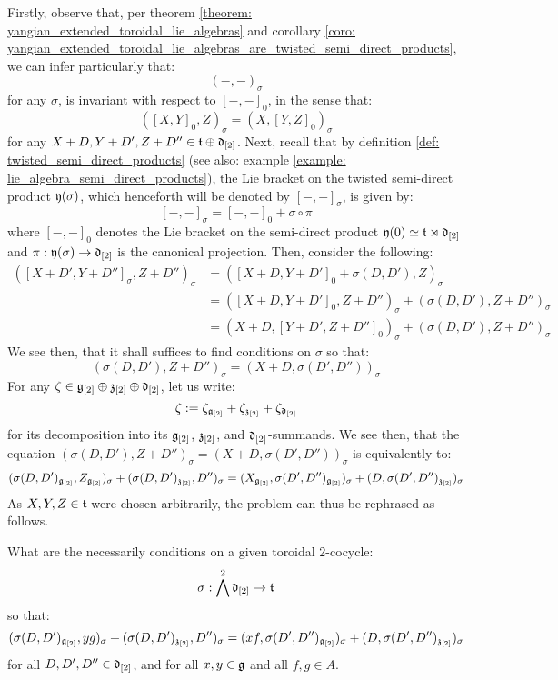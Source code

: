         Firstly, observe that, per theorem \ref{theorem: yangian_extended_toroidal_lie_algebras} and corollary \ref{coro: yangian_extended_toroidal_lie_algebras_are_twisted_semi_direct_products}, we can infer particularly that:
            $$(-, -)_{\sigma}$$
        for any $\sigma$, is invariant with respect to $[-, -]_0$, in the sense that:
            $$([X, Y]_0, Z)_{\sigma} = (X, [Y, Z]_0)_{\sigma}$$
        for any $X + D, Y + D', Z + D'' \in \mathfrak{t} \oplus \mathfrak{d}_{[2]}$. Next, recall that by definition \ref{def: twisted_semi_direct_products} (see also: example \ref{example: lie_algebra_semi_direct_products}), the Lie bracket on the twisted semi-direct product $\mathfrak{y}(\sigma)$, which henceforth will be denoted by $[-, -]_{\sigma}$, is given by:
            $$[-, -]_{\sigma} = [-, -]_0 + \sigma \circ \pi$$
        where $[-, -]_0$ denotes the Lie bracket on the semi-direct product $\mathfrak{y}(0) \simeq \mathfrak{t} \rtimes \mathfrak{d}_{[2]}$ and $\pi: \mathfrak{y}(\sigma) \to \mathfrak{d}_{[2]}$ is the canonical projection. Then, consider the following:
            $$
                \begin{aligned}
                    ([X + D', Y + D'']_{\sigma}, Z + D'')_{\sigma} & = ([X + D, Y + D']_0 + \sigma(D, D'), Z)_{\sigma}
                    \\
                    & = ([X + D, Y + D']_0, Z + D'')_{\sigma} + (\sigma(D, D'), Z + D'')_{\sigma}
                    \\
                    & = (X + D, [Y + D', Z + D'']_0)_{\sigma} + (\sigma(D, D'), Z + D'')_{\sigma}
                \end{aligned}
            $$
        We see then, that it shall suffices to find conditions on $\sigma$ so that:
            $$(\sigma(D, D'), Z + D'')_{\sigma} = (X + D, \sigma(D', D''))_{\sigma}$$
        For any $\zeta \in \mathfrak{g}_{[2]} \oplus \mathfrak{z}_{[2]} \oplus \mathfrak{d}_{[2]}$, let us write:
            $$\zeta := \zeta_{\mathfrak{g}_{[2]}} + \zeta_{\mathfrak{z}_{[2]}} + \zeta_{\mathfrak{d}_{[2]}}$$
        for its decomposition into its $\mathfrak{g}_{[2]}$, $\mathfrak{z}_{[2]}$, and $\mathfrak{d}_{[2]}$-summands. We see then, that the equation $(\sigma(D, D'), Z + D'')_{\sigma} = (X + D, \sigma(D', D''))_{\sigma}$ is equivalently to:
            $$(\sigma(D, D')_{\mathfrak{g}_{[2]}}, Z_{\mathfrak{g}_{[2]}})_{\sigma} + (\sigma(D, D')_{\mathfrak{z}_{[2]}}, D'')_{\sigma} = (X_{\mathfrak{g}_{[2]}}, \sigma(D', D'')_{\mathfrak{g}_{[2]}})_{\sigma} + (D, \sigma(D', D'')_{\mathfrak{z}_{[2]}})_{\sigma}$$
        As $X, Y, Z \in \mathfrak{t}$ were chosen arbitrarily, the problem can thus be rephrased as follows.
        \begin{question}
            What are the necessarily conditions on a given toroidal $2$-cocycle:
                $$\sigma: \bigwedge^2 \mathfrak{d}_{[2]} \to \mathfrak{t}$$
            so that:
                $$(\sigma(D, D')_{\mathfrak{g}_{[2]}}, yg)_{\sigma} + (\sigma(D, D')_{\mathfrak{z}_{[2]}}, D'')_{\sigma} = (xf, \sigma(D', D'')_{\mathfrak{g}_{[2]}})_{\sigma} + (D, \sigma(D', D'')_{\mathfrak{z}_{[2]}})_{\sigma}$$
            for all $D, D', D'' \in \mathfrak{d}_{[2]}$, and for all $x, y \in \mathfrak{g}$ and all $f, g \in A$.
        \end{question}
